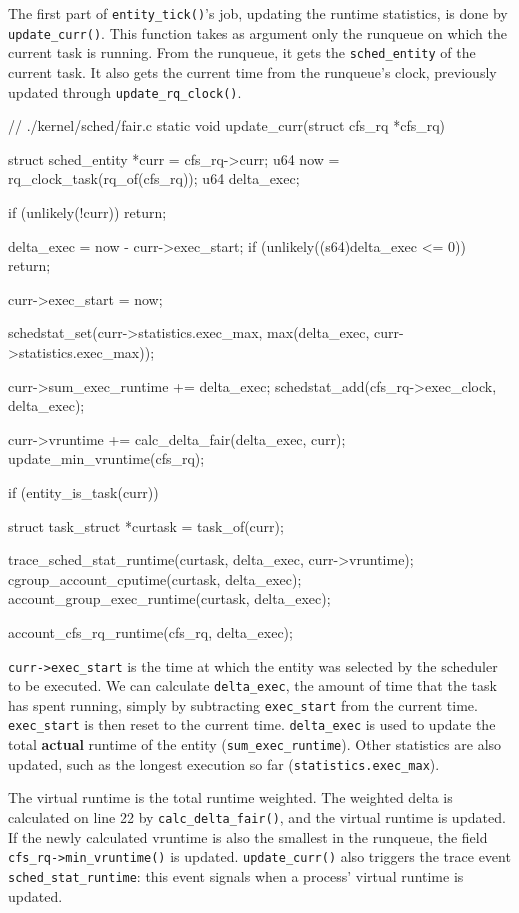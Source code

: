 The first part of \verb|entity_tick()|'s job, updating the runtime statistics, is done by \verb|update_curr()|. This function takes as argument only the runqueue on which the current task is running. From the runqueue, it gets the \verb|sched_entity| of the current task. It also gets the current time from the runqueue's clock, previously updated through \verb|update_rq_clock()|.

\label{trace:sched_stat_runtime}
\begin{code}
// ./kernel/sched/fair.c
static void update_curr(struct cfs_rq *cfs_rq)
{
	struct sched_entity *curr = cfs_rq->curr;
	u64 now = rq_clock_task(rq_of(cfs_rq));
	u64 delta_exec;

	if (unlikely(!curr))
		return;

	delta_exec = now - curr->exec_start;
	if (unlikely((s64)delta_exec <= 0))
		return;

	curr->exec_start = now;

	schedstat_set(curr->statistics.exec_max,
		      max(delta_exec, curr->statistics.exec_max));

	curr->sum_exec_runtime += delta_exec;
	schedstat_add(cfs_rq->exec_clock, delta_exec);

	curr->vruntime += calc_delta_fair(delta_exec, curr);
	update_min_vruntime(cfs_rq);

	if (entity_is_task(curr)) {
		struct task_struct *curtask = task_of(curr);

		trace_sched_stat_runtime(curtask, delta_exec, curr->vruntime);
		cgroup_account_cputime(curtask, delta_exec);
		account_group_exec_runtime(curtask, delta_exec);
	}

	account_cfs_rq_runtime(cfs_rq, delta_exec);
}
\end{code}
\verb|curr->exec_start| is the time at which the entity was selected by the scheduler to be executed. %
We can calculate \verb|delta_exec|, the amount of time that the task has spent running, simply by subtracting \verb|exec_start| from the current time. \verb|exec_start| is then reset to the current time. \verb|delta_exec| is used to update the total \textbf{actual} runtime of the entity (\verb|sum_exec_runtime|). Other statistics are also updated, such as the longest execution so far (\verb|statistics.exec_max|).

The virtual runtime is the total runtime weighted. The weighted delta is calculated on line 22 by \verb|calc_delta_fair()|, and the virtual runtime is updated.
If the newly calculated vruntime is also the smallest in the runqueue, the field \verb|cfs_rq->min_vruntime()| is updated.
\verb|update_curr()| also triggers the trace event \verb|sched_stat_runtime|: this event signals when a process' virtual runtime is updated.

